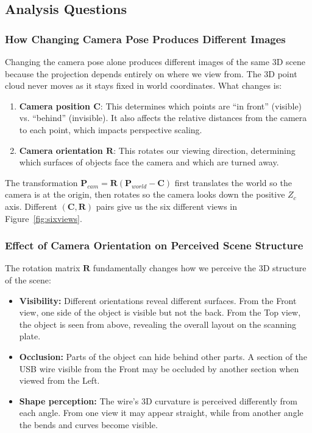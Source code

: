 \documentclass[12pt]{article}
\begin{document}
\subsection*{Analysis Questions}

\subsubsection*{How Changing Camera Pose Produces Different Images}

Changing the camera pose alone produces different images of the same 3D scene because the projection depends entirely on where we view from. The 3D point cloud never moves as it stays fixed in world coordinates. What changes is:
\begin{enumerate}
    \item \textbf{Camera position $\mathbf{C}$}: This determines which points are ``in front'' (visible) vs. ``behind'' (invisible). It also affects the relative distances from the camera to each point, which impacts perspective scaling.
    \item \textbf{Camera orientation $\mathbf{R}$}: This rotates our viewing direction, determining which surfaces of objects face the camera and which are turned away.
\end{enumerate}

The transformation $\mathbf{P}_{cam} = \mathbf{R}(\mathbf{P}_{world} - \mathbf{C})$ first translates the world so the camera is at the origin, then rotates so the camera looks down the positive $Z_c$ axis. Different $(\mathbf{C}, \mathbf{R})$ pairs give us the six different views in Figure~\ref{fig:sixviews}.

\subsubsection*{Effect of Camera Orientation on Perceived Scene Structure}

The rotation matrix $\mathbf{R}$ fundamentally changes how we perceive the 3D structure of the scene:
\begin{itemize}
    \item \textbf{Visibility:} Different orientations reveal different surfaces. From the Front view, one side of the object is visible but not the back. From the Top view, the object is seen from above, revealing the overall layout on the scanning plate.
    \item \textbf{Occlusion:} Parts of the object can hide behind other parts. A section of the USB wire visible from the Front may be occluded by another section when viewed from the Left.
    \item \textbf{Shape perception:} The wire's 3D curvature is perceived differently from each angle. From one view it may appear straight, while from another angle the bends and curves become visible.
\end{itemize}
\end{document}
